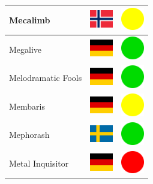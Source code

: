 \documentclass[12pt, a4paper, twoside]{report}
\begin{document}
\begin{center}
\begin{longtable}{|p{5cm}|p{2cm}|p{2cm}|}
 Mecalimb                                                   & \includegraphics[width=1cm]{../4x3/no} &   \includegraphics[width=1cm]{../likes/m} \\ \hline
 Megalive                                                   & \includegraphics[width=1cm]{../4x3/de} &   \includegraphics[width=1cm]{../likes/y} \\ \hline
 Melodramatic Fools                                         & \includegraphics[width=1cm]{../4x3/de} &   \includegraphics[width=1cm]{../likes/y} \\ \hline
 Membaris                                                   & \includegraphics[width=1cm]{../4x3/de} &   \includegraphics[width=1cm]{../likes/m} \\ \hline
 Mephorash                                                  & \includegraphics[width=1cm]{../4x3/se} &   \includegraphics[width=1cm]{../likes/y} \\ \hline
 Metal Inquisitor                                           & \includegraphics[width=1cm]{../4x3/de} &   \includegraphics[width=1cm]{../likes/n} \\ \hline

\end{longtable}
\end{center}
\end{document}
